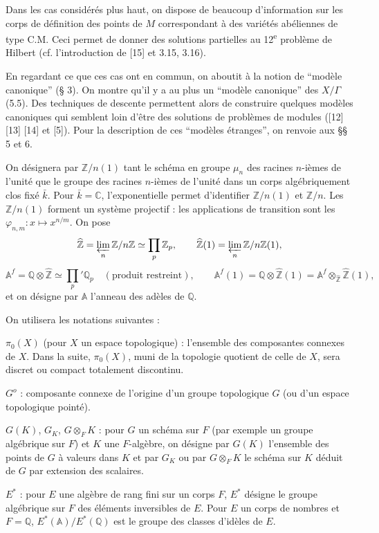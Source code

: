 \documentclass[10pt]{article}
\newcommand{\A}{\mathbb A}
\newcommand{\Af}{\mathbb A^f}
\newcommand{\C}{\mathbb C}
\newcommand{\Q}{\mathbb Q}
\newcommand{\Z}{\mathbb Z}
\newcommand{\limproj}{\varprojlim}
\newcommand{\whZ}{\widehat{\Z}}
\newcommand{\pii}{\pi_0}
\begin{document}
Dans les cas considérés plus haut, on dispose de beaucoup d'information sur les corps de définition des points de $M$ correspondant à des variétés abéliennes de type C.M. Ceci permet de donner des solutions partielles au 12\textsuperscript{e} problème de Hilbert (cf. l'introduction de [15] et 3.15, 3.16).

En regardant ce que ces cas ont en commun, on aboutit à la notion de ``modèle canonique'' (§ 3). On montre qu'il y a au plus un ``modèle canonique'' des $X/\Gamma$ (5.5). Des techniques de descente permettent alors de construire quelques modèles canoniques qui semblent loin d'être des solutions de problèmes de modules ([12] [13] [14] et [5]). Pour la description de ces ``modèles étranges'', on renvoie aux §§ 5 et 6.

On désignera par $\Z/n(1)$ tant le schéma en groupe $\mu_n$ des racines $n$-ièmes de l'unité que le groupe des racines $n$-ièmes de l'unité dans un corps algébriquement clos fixé $\bar{k}$. Pour $\bar{k}=\C$, l'exponentielle permet d'identifier $\Z/n(1)$ et $\Z/n$. Les $\Z/n(1)$ forment un système projectif : les applications de transition sont les $\varphi_{n,m}:x\longmapsto x^{n/m}$. On pose
\[
\whZ=\limproj_n \Z/n\Z \simeq \prod_p \Z_p,\qquad
\whZ(1)=\limproj_n \Z/n\Z(1),
\]
\[
\Af=\Q\otimes\whZ\simeq \prod_p{}'\Q_p\quad(\text{produit restreint}),\qquad
\Af(1)=\Q\otimes\whZ(1)=\Af\otimes_{\whZ}\whZ(1),
\]
et on désigne par $\A$ l'anneau des adèles de $\Q$.

On utilisera les notations suivantes :

\noindent $\pii(X)$ (pour $X$ un espace topologique) : l'ensemble des composantes connexes de $X$. Dans la suite, $\pii(X)$, muni de la topologie quotient de celle de $X$, sera discret ou compact totalement discontinu.

\noindent $G^o$ : composante connexe de l'origine d'un groupe topologique $G$ (ou d'un espace topologique pointé).

\noindent $G(K)$, $G_K$, $G\otimes_FK$ : pour $G$ un schéma sur $F$ (par exemple un groupe algébrique sur $F$) et $K$ une $F$-algèbre, on désigne par $G(K)$ l'ensemble des points de $G$ à valeurs dans $K$ et par $G_K$ ou par $G\otimes_FK$ le schéma sur $K$ déduit de $G$ par extension des scalaires.

\noindent $E^*$ : pour $E$ une algèbre de rang fini sur un corps $F$, $E^*$ désigne le groupe algébrique sur $F$ des éléments inversibles de $E$. Pour $E$ un corps de nombres et $F=\Q$, $E^*(\A)/E^*(\Q)$ est le groupe des classes d'idèles de $E$.
\end{document}
